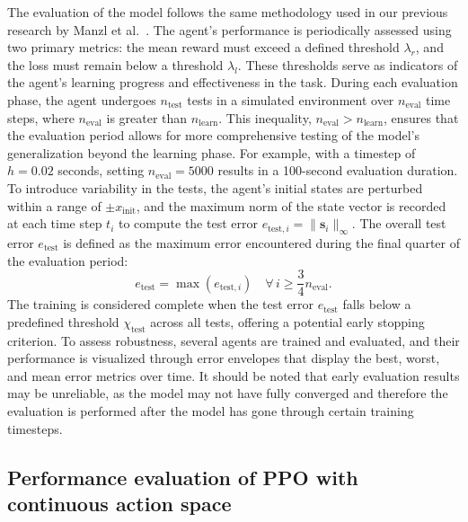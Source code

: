 The evaluation of the model follows the same methodology used in our previous research by Manzl et al.~\cite{manzl2023relrl}. The agent's performance is periodically assessed using two primary metrics: the mean reward must exceed a defined threshold \( \lambda_r \), and the loss must remain below a threshold \( \lambda_l \). These thresholds serve as indicators of the agent's learning progress and effectiveness in the task. 
During each evaluation phase, the agent undergoes \( n_{\text{test}} \) tests in a simulated environment over \( n_{\text{eval}} \) time steps, where \( n_{\text{eval}} \) is greater than \( n_{\text{learn}} \). This inequality, \( n_{\text{eval}} > n_{\text{learn}} \), ensures that the evaluation period allows for more comprehensive testing of the model's generalization beyond the learning phase.
For example, with a timestep of \( h = 0.02 \) seconds, setting \( n_{\text{eval}} = 5000 \) results in a 100-second evaluation duration.
To introduce variability in the tests, the agent's initial states are perturbed within a range of \( \pm x_{\text{init}} \), and the maximum norm of the state vector is recorded at each time step \( t_i \) to compute the test error \( e_{\text{test},i} = \|\mathbf{s}_i\|_{\infty} \). The overall test error \( e_{\text{test}} \) is defined as the maximum error encountered during the final quarter of the evaluation period:
\begin{equation}
	e_{\text{test}} = \max(e_{\text{test},i}) \quad \forall \, i \geq \frac{3}{4}n_{\text{eval}}.
\end{equation}
The training is considered complete when the test error \( e_{\text{test}} \) falls below a predefined threshold \( \chi_{\text{test}} \) across all tests, offering a potential early stopping criterion.
To assess robustness, several agents are trained and evaluated, and their performance is visualized through error envelopes that display the best, worst, and mean error metrics over time. It should be noted that early evaluation results may be unreliable, as the model may not have fully converged and therefore the evaluation is performed after the model has gone through certain training timesteps.

\subsection{Performance evaluation of PPO with continuous action space} \label{subsec: Performance evaluation of PPO with continuous action space}

